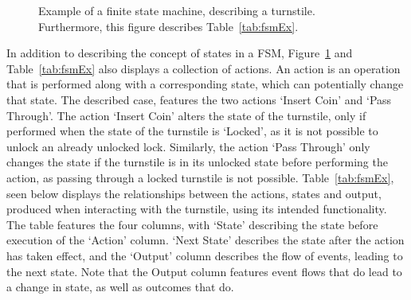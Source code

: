 \begin{figure}[h]
  \centering
  \caption{Example of a finite state machine, describing a turnstile. Furthermore, this figure describes Table~\ref{tab:fsmEx}.}
  \label{fig:fsmEx}
\end{figure}
In addition to describing the concept of states in a FSM, Figure~\ref{fig:fsmEx} and Table~\ref{tab:fsmEx} also displays a collection of actions. An action is an operation that is performed along with a corresponding state, which can potentially change that state. The described case, features the two actions `Insert Coin' and `Pass Through'. The action `Insert Coin' alters the state of the turnstile, only if performed when the state of the turnstile is `Locked', as it is not possible to unlock an already unlocked lock. Similarly, the action `Pass Through' only changes the state if the turnstile is in its unlocked state before performing the action, as passing through a locked turnstile is not possible.
\newpage
\noindent
Table~\ref{tab:fsmEx}, seen below displays the relationships between the actions, states and output, produced when interacting with the turnstile, using its intended functionality. The table features the four columns, with `State' describing the state before execution of the `Action' column. `Next State' describes the state after the action has taken effect, and the `Output' column describes the flow of events, leading to the next state. Note that the Output column features event flows that do  lead to a change in state, as well as outcomes that do.
